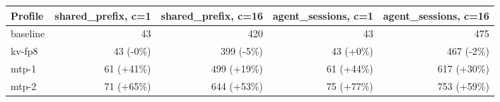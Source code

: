 \begin{tabular}{lrrrr}
\toprule
Profile & shared\_prefix, c=1 & shared\_prefix, c=16 & agent\_sessions, c=1 & agent\_sessions, c=16 \\
\midrule
baseline & 43 & 420 & 43 & 475 \\
kv-fp8 & 43 (-0\%) & 399 (-5\%) & 43 (+0\%) & 467 (-2\%) \\
mtp-1 & 61 (+41\%) & 499 (+19\%) & 61 (+44\%) & 617 (+30\%) \\
mtp-2 & 71 (+65\%) & 644 (+53\%) & 75 (+77\%) & 753 (+59\%) \\
\bottomrule
\end{tabular}
